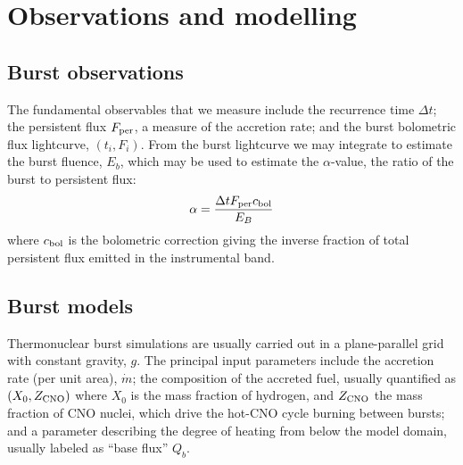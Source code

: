 \documentclass{aastex61}
\newcommand\latex{La\TeX}
\begin{document}

\section{Observations and modelling} 
\label{sec:data}

\subsection{Burst observations}
\label{subsec:data}

The fundamental observables that we measure include the recurrence time $\Delta t$; the persistent flux $F_{\rm per}$, a measure of the accretion rate; and the burst bolometric flux lightcurve, $(t_i,F_{i})$. From the burst lightcurve we may integrate to estimate the burst fluence, $E_b$, which may be used to estimate the $\alpha$-value, the ratio of the burst to persistent flux: 
\begin{equation}
\alpha = \frac{\Delta t F_{\rm per} c_{\rm bol}}{E_B}
\end{equation}
where $c_{\rm bol}$ is the bolometric correction giving the inverse fraction of total persistent flux emitted in the instrumental band.

\subsection{Burst models}
\label{subsec:models}

Thermonuclear burst simulations \cite[e.g. with {\sc kepler};][]{woos04} are usually carried out in a plane-parallel grid with constant gravity, $g$. The principal input parameters include the accretion rate (per unit area), $\dot{m}$; the composition of the accreted fuel, usually quantified as $(X_0, Z_{\rm CNO})$ where $X_0$ is the mass fraction of hydrogen, and $Z_{\rm CNO}$ the mass fraction of CNO nuclei, which drive the hot-CNO cycle burning between bursts; and a parameter describing the degree of heating from below the model domain, usually labeled as ``base flux'' $Q_b$.
\end{document}
